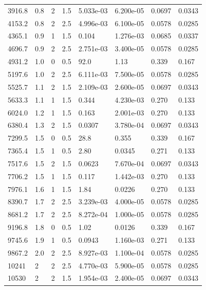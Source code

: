 \documentclass[preview]{standalone}
\begin{document}
{{\begin{tabular}{L{1.2cm}C{1.2cm} C{0.3cm}C{0.5cm} C{1.4cm}C{1.4cm} C{1.4cm}C{1.4cm}}
  3916.8  &   0.8  & 2     & 1.5 &  5.033e-03  & 6.200e-05  & 0.0697 &  0.0343   \\ 
  4153.2  &   0.8  & 2     & 2.5 &  4.996e-03  & 6.100e-05  & 0.0578 &  0.0285   \\ 
  4365.1  &   0.9  & 1     & 1.5 &  0.104  & 1.276e-03  & 0.0685 &  0.0337   \\ 
  4696.7  &   0.9  & 2     & 2.5 &  2.751e-03  & 3.400e-05  & 0.0578 &  0.0285   \\ 
  4931.2  &   1.0  & 0     & 0.5 &  92.0  & 1.13  & 0.339 &  0.167   \\ 
  5197.6  &   1.0  & 2     & 2.5 &  6.111e-03  & 7.500e-05  & 0.0578 &  0.0285   \\ 
  5525.7  &   1.1  & 2     & 1.5 &  2.109e-03  & 2.600e-05  & 0.0697 &  0.0343   \\ 
  5633.3  &   1.1  & 1     & 1.5 &  0.344  & 4.230e-03  & 0.270 &  0.133   \\ 
  6024.0  &   1.2  & 1     & 1.5 &  0.163  & 2.001e-03  & 0.270 &  0.133   \\ 
  6380.4  &   1.3  & 2     & 1.5 &  0.0307  & 3.780e-04  & 0.0697 &  0.0343   \\ 
  7299.5  &   1.5  & 0     & 0.5 &  28.8  & 0.355  & 0.339 &  0.167   \\ 
  7365.4  &   1.5  & 1     & 0.5 &  2.80  & 0.0345  & 0.271 &  0.133   \\ 
  7517.6  &   1.5  & 2     & 1.5 &  0.0623  & 7.670e-04  & 0.0697 &  0.0343   \\ 
  7706.2  &   1.5  & 1     & 1.5 &  0.117  & 1.442e-03  & 0.270 &  0.133   \\ 
  7976.1  &   1.6  & 1     & 1.5 &  1.84  & 0.0226  & 0.270 &  0.133   \\ 
  8390.7  &   1.7  & 2     & 2.5 &  3.239e-03  & 4.000e-05  & 0.0578 &  0.0285   \\ 
  8681.2  &   1.7  & 2     & 2.5 &  8.272e-04  & 1.000e-05  & 0.0578 &  0.0285   \\ 
  9196.8  &   1.8  & 0     & 0.5 &  1.02  & 0.0126  & 0.339 &  0.167   \\ 
  9745.6  &   1.9  & 1     & 0.5 &  0.0943  & 1.160e-03  & 0.271 &  0.133   \\ 
  9867.2  &   2.0  & 2     & 2.5 &  8.927e-03  & 1.100e-04  & 0.0578 &  0.0285   \\ 
  10241  &     2  & 2     & 2.5 &  4.770e-03  & 5.900e-05  & 0.0578 &  0.0285   \\ 
  10530  &     2  & 2     & 1.5 &  1.954e-03  & 2.400e-05  & 0.0697 &  0.0343   \\ 

\end{tabular}}}
\end{document}
